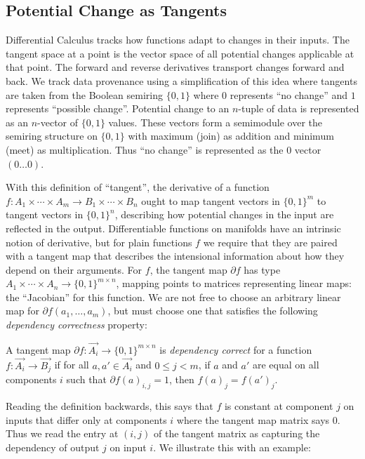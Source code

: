 \subsection{Potential Change as Tangents}

Differential Calculus tracks how functions adapt to changes in
their inputs. The tangent space at a point is the vector space of
all potential changes applicable at that point. The forward and
reverse derivatives transport changes forward and back. We track
data provenance using a simplification of this idea where tangents
are taken from the Boolean semiring $\{0,1\}$ where $0$ represents
``no change'' and $1$ represents ``possible change''. Potential
change to an $n$-tuple of data is represented as an $n$-vector of
$\{0,1\}$ values. These vectors form a semimodule over the semiring
structure on $\{0,1\}$ with maximum (join) as addition and minimum
(meet) as multiplication. Thus ``no change'' is represented as the
$0$ vector $(0 \dots 0)$.

With this definition of ``tangent'', the derivative of a
function
$f : A_1 \times \cdots \times A_m \to B_1 \times \cdots \times B_n$
ought to map tangent vectors in $\{0,1\}^m$ to tangent vectors in
$\{0,1\}^n$, describing how potential changes in the input are
reflected in the output. Differentiable functions on manifolds have
an intrinsic notion of derivative, but for plain functions $f$ we
require that they are paired with a tangent map that describes the
intensional information about how they depend on their
arguments. For $f$, the tangent map $\partial f$ has type
$A_1 \times \cdots \times A_n \to \{0,1\}^{m\times n}$, mapping
points to matrices representing linear maps: the ``Jacobian'' for
this function. We are not free to choose an arbitrary linear map for
$\partial f(a_1, \dots, a_m)$, but must choose one that satisfies
the following \emph{dependency correctness} property:

\begin{definition} A tangent map
  $\partial f : \overrightarrow{A_i} \to \{0,1\}^{m \times n}$ is
  \emph{dependency correct} for a function
  $f : \overrightarrow{A_i} \to \overrightarrow{B_j}$ if for all
  $a, a' \in \overrightarrow{A_i}$ and $0 \leq j < m$, if $a$ and
  $a'$ are equal on all components $i$ such that
  $\partial f(a)_{i,j} = 1$, then $f(a)_j = f(a')_j$.
\end{definition}

Reading the definition backwards, this says that $f$ is
constant at component $j$ on inputs that differ only at components
$i$ where the tangent map matrix says $0$. Thus we read the entry at
$(i,j)$ of the tangent matrix as capturing the dependency of output
$j$ on input $i$. We illustrate this with an example:

